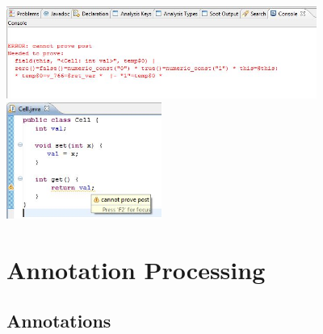 \documentclass{article}
\begin{document}
\includegraphics[width=4in]{images/console.jpg}\\

\includegraphics[width=2in]{images/marker.jpg}

\section{Annotation Processing}
\label{sec:annotationprocessing}

\subsection*{Annotations}
\end{document}
